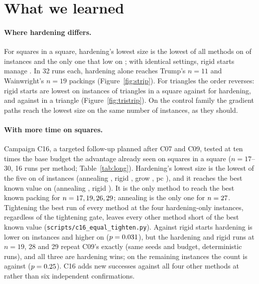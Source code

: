 \section{What we learned}\label{sec:learned}
\paragraph{Where hardening differs.} For squares in a square, hardening's lowest size is the lowest of all methods on \CsevenSquInSquHardenLowest{} of \CsevenSquInSquN{} instances and the only one that low on \CsevenSquInSquHardenSole{}; with identical settings, rigid starts manage \CsevenSquInSquRigidLowest{}. In 32 runs each, hardening alone reaches Trump's $n=11$ and Wainwright's $n=19$ packings (Figure~\ref{fig:strip}). For triangles the order reverses: rigid starts are lowest on \CsevenTriInSquRigidLowest{} instances of triangles in a square against \CsevenTriInSquHardenLowest{} for hardening, and \CsevenTriInTriRigidLowest{} against \CsevenTriInTriHardenLowest{} in a triangle (Figure~\ref{fig:tristrip}). On the control family the gradient paths reach the lowest size on the same number of instances, as they should.

\paragraph{With more time on squares.} Campaign C16, a targeted follow-up planned after C07 and C09, tested at ten times the base budget the advantage already seen on squares in a square ($n=17$--$30$, 16 runs per method; Table~\ref{tab:long}). Hardening's lowest size is the lowest of the five on \LongHardenLowest{} of \LongN{} instances (annealing \LongSaLowest, rigid \LongRigidLowest, grow \LongGrowLowest, pc \LongPcLowest), and it reaches the best known value on \LongHardenReached{} (annealing \LongSaReached, rigid \LongRigidReached). It is the only method to reach the best known packing for $n=17, 19, 26, 29$; annealing is the only one for $n=27$. Tightening the best run of every method at the four hardening-only instances, regardless of the tightening gate, leaves every other method short of the best known value (\texttt{scripts/c16\_equal\_tighten.py}). Against rigid starts hardening is lower on \LongHLower{} instances and higher on \LongRLower{} ($p=0.031$), but the hardening and rigid runs at $n=19$, 28 and 29 repeat C09's exactly (same seeds and budget, deterministic runs), and all three are hardening wins; on the remaining \LongNewN{} instances the count is \LongNewHLower{} against \LongNewRLower{} ($p=0.25$). C16 adds new successes against all four other methods at \LongHardenOnlyReachedNewNs rather than six independent confirmations.

